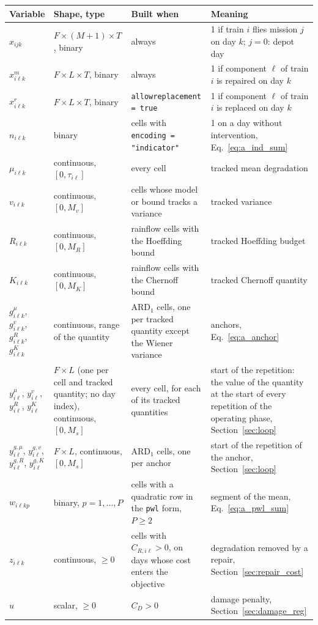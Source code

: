 \documentclass[11pt,a4paper]{article}
\theoremstyle{plain}
\theoremstyle{definition}
\newcommand{\ARDone}{\mathrm{ARD}_{1}}
\renewcommand{\_}{\textunderscore\allowbreak{}}
\begin{document}
\begingroup\small
\begin{longtable}{@{}L{2.3cm}L{2.6cm}L{4.2cm}L{5.4cm}@{}}
\toprule
Variable & Shape, type & Built when & Meaning \\
\midrule
\endhead
$x_{ijk}$ & $F \times (M{+}1) \times T$, binary & always &
  1 if train $i$ flies mission $j$ on day $k$; $j = 0$: depot day \\
$x^m_{i\ell k}$ & $F \times L \times T$, binary & always &
  1 if component $\ell$ of train $i$ is repaired on day $k$ \\
$x^r_{i\ell k}$ & $F \times L \times T$, binary & \texttt{allow\_replacement = true} &
  1 if component $\ell$ of train $i$ is replaced on day $k$ \\
$n_{i\ell k}$ & binary & cells with \texttt{encoding = "indicator"} &
  1 on a day without intervention, Eq.~\eqref{eq:a_ind_sum} \\
$\mu_{i\ell k}$ & continuous, $[0, \tau_{i\ell}]$ & every cell &
  tracked mean degradation \\
$v_{i\ell k}$ & continuous, $[0, M_v]$ & cells whose model or bound tracks a variance &
  tracked variance \\
$R_{i\ell k}$ & continuous, $[0, M_R]$ & rainflow cells with the Hoeffding bound &
  tracked Hoeffding budget \\
$K_{i\ell k}$ & continuous, $[0, M_K]$ & rainflow cells with the Chernoff bound &
  tracked Chernoff quantity \\
$g^{\mu}_{i\ell k}$, $g^{v}_{i\ell k}$, $g^{R}_{i\ell k}$, $g^{K}_{i\ell k}$ &
  continuous, range of the quantity & $\ARDone$ cells, one per tracked quantity
  except the Wiener variance & anchors, Eq.~\eqref{eq:a_anchor} \\
$y^{\mu}_{i\ell}$, $y^{v}_{i\ell}$, $y^{R}_{i\ell}$, $y^{K}_{i\ell}$ &
  $F \times L$ (one per cell and tracked quantity; no day index), continuous,
  $[0, M_s]$ & every cell, for each of its tracked quantities &
  start of the repetition: the value of the quantity at the start of every repetition of
  the operating phase, Section~\ref{sec:loop} \\
$y^{g,\mu}_{i\ell}$, $y^{g,v}_{i\ell}$, $y^{g,R}_{i\ell}$, $y^{g,K}_{i\ell}$ &
  $F \times L$, continuous, $[0, M_s]$ & $\ARDone$ cells, one per anchor &
  start of the repetition of the anchor, Section~\ref{sec:loop} \\
$w_{i\ell kp}$ & binary, $p = 1, \ldots, P$ & cells with a quadratic row in the
  \texttt{pwl} form, $P \geq 2$ & segment of the mean, Eq.~\eqref{eq:a_pwl_sum} \\
$z_{i\ell k}$ & continuous, $\geq 0$ & cells with $C_{R,i\ell} > 0$, on days whose cost
  enters the objective & degradation removed by a repair,
  Section~\ref{sec:repair_cost} \\
$u$ & scalar, $\geq 0$ & $C_D > 0$ & damage penalty,
  Section~\ref{sec:damage_reg} \\
\bottomrule
\end{longtable}
\endgroup
\end{document}

